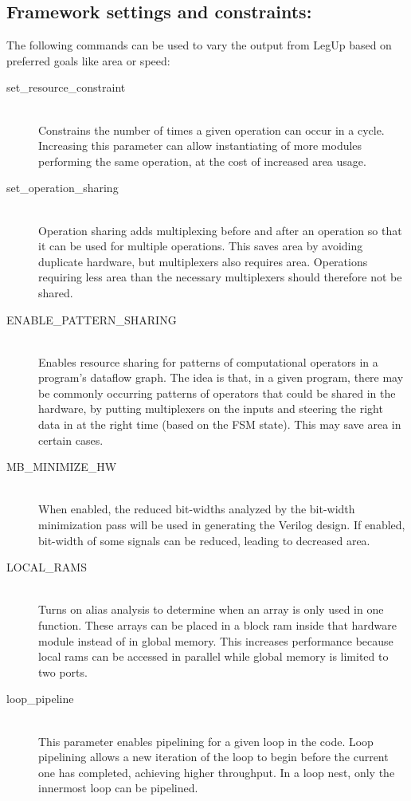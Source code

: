 \subsection{Framework settings and constraints:}
The following commands can be used to vary the output from LegUp based on preferred goals like area or speed:
\begin{description}
  \item[set\_resource\_constraint] \hfill \\
      Constrains the number of times a given operation can occur in a cycle. Increasing this parameter can allow instantiating of more modules performing the same operation, at the cost of increased area usage. 
  \item[set\_operation\_sharing] \hfill \\
      Operation sharing adds multiplexing before and after an operation so that it can be used for multiple operations. This saves area by avoiding duplicate hardware, but multiplexers also requires area. Operations requiring less area than the necessary multiplexers should therefore not be shared.
  \item[ENABLE\_PATTERN\_SHARING] \hfill \\
      Enables resource sharing for patterns of computational operators in a program’s dataflow graph. The idea is that, in a given program, there may be commonly occurring patterns of operators that could be shared in the hardware, by putting multiplexers on the inputs and steering the right data in at the right time (based on the FSM state). This may save area in certain cases. \cite{hadjis2012impact}
  \item[MB\_MINIMIZE\_HW] \hfill \\
      When enabled, the reduced bit-widths analyzed by the bit-width minimization pass will be used in generating the Verilog design. If enabled, bit-width of some signals can be reduced, leading to decreased area.
  \item[LOCAL\_RAMS] \hfill \\
      Turns on alias analysis to determine when an array is only used in one function. These arrays can be placed in a block \gls{ram} inside that hardware module instead of in global memory. This increases performance because local \gls{ram}s can be accessed in parallel while global memory is limited to two ports.
  \item[loop\_pipeline] \hfill \\
     This parameter enables pipelining for a given loop in the code. Loop pipelining allows a new iteration of the loop to begin before the current one has completed, achieving higher throughput. In a loop nest, only the innermost loop can be pipelined.
\end{description}
